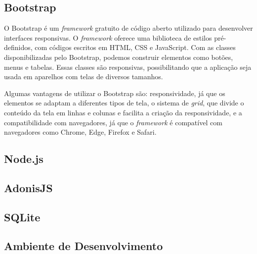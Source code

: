 \subsection{Bootstrap}

O Bootstrap é um \textit{framework} gratuito de código aberto utilizado para desenvolver interfaces responsivas. O \textit{framework} oferece uma biblioteca de estilos pré-definidos, com códigos escritos em HTML, CSS e JavaScript. Com as classes disponibilizadas pelo Bootstrap, podemos construir elementos como botões, menus e tabelas. Essas classes são responsivas, possibilitando que a aplicação seja usada em aparelhos com telas de diversos tamanhos.

Algumas vantagens de utilizar o Bootstrap são: responsividade, já que os elementos se adaptam a diferentes tipos de tela, o sistema de \textit{grid}, que divide o conteúdo da tela em linhas e colunas e facilita a criação da responsividade, e a compatibilidade com navegadores, já que o \textit{framework} é compatível com navegadores como Chrome, Edge, Firefox e Safari.

\subsection{Node.js}

\subsection{AdonisJS}

\subsection{SQLite}

\subsection{Ambiente de Desenvolvimento}